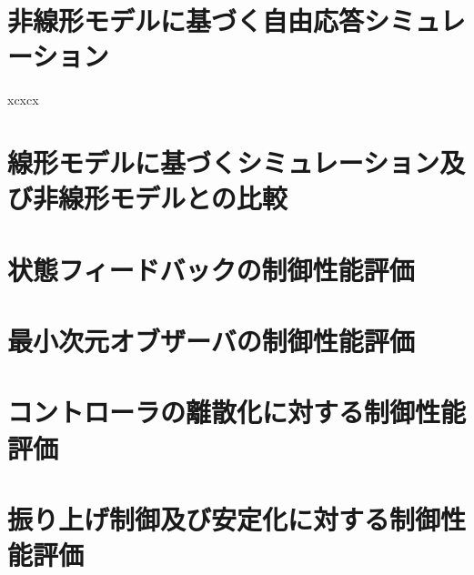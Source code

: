 \section{非線形モデルに基づく自由応答シミュレーション}
xcxcx
\section{線形モデルに基づくシミュレーション及び非線形モデルとの比較}
\section{状態フィードバックの制御性能評価}
\section{最小次元オブザーバの制御性能評価}
\section{コントローラの離散化に対する制御性能評価}
\section{振り上げ制御及び安定化に対する制御性能評価}
